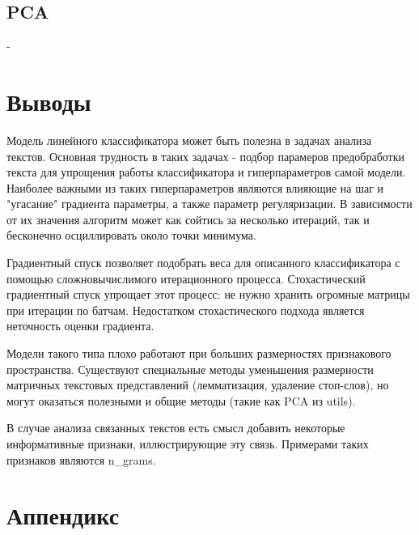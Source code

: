 \documentclass{article}
\begin{document}
        \subsection{PCA}
            -

    \section{Выводы}
            Модель линейного классификатора может быть полезна в задачах анализа текстов. Основная трудность в таких задачах - подбор парамеров предобработки текста для упрощения работы классификатора и гиперпараметров самой модели. Наиболее важными из таких гиперпараметров являются влияющие на шаг и "угасание" градиента параметры, а также параметр регуляризации. В зависимости от их значения алгоритм может как сойтись за несколько итераций, так и бесконечно осциллировать около точки минимума.

            Градиентный спуск позволяет подобрать веса для описанного классификатора с помощью сложновычислимого итерационного процесса. Стохастический градиентный спуск упрощает этот процесс: не нужно хранить огромные матрицы при итерации по батчам. Недостатком стохастического подхода является неточность оценки градиента.

            Модели такого типа плохо работают при больших размерностях признакового пространства. Существуют специальные методы уменьшения размерности матричных текстовых представлений (лемматизация, удаление стоп-слов), но могут оказаться полезными и общие методы (такие как PCA из utils).

            В случае анализа связанных текстов есть смысл добавить некоторые информативные признаки, иллюстрирующие эту связь. Примерами таких признаков являются n\_grams.

    \section{Аппендикс}
\end{document}
